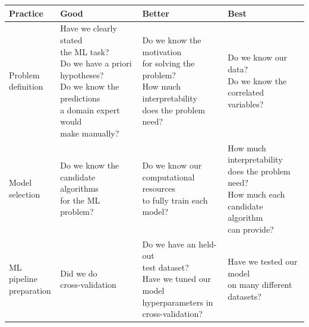 \documentclass[11pt,]{article}
\begin{document}
\small

\begin{tabular}{|l|l|l|l|}
\hline

\rowcolor{lightgray}
\textbf{Practice} & \textbf{Good} & \textbf{Better} & \textbf{Best} \\ \hline

\makecell[l]{Problem \\ definition} & \makecell[l]{Have we clearly stated \\ the ML task? \\ Do we have a priori hypotheses? \\Do we know the predictions \\ a domain expert would \\ make manually?} & \makecell[l]{Do we know the motivation \\ for solving the problem? \\ How much interpretability \\ does the problem need? } & \makecell[l]{Do we know our data? \\ Do we know the correlated \\ variables? } \\ \hline

\makecell[l]{Model \\ selection} & \makecell[l]{Do we know the \\ candidate algorithms \\ for the ML problem? \\} & \makecell[l]{Do we know our \\ computational resources \\ to fully train each model?} & \makecell[l]{How much interpretability \\ does the problem need? \\ How much each \\ candidate algorithm \\ can provide?} \\ \hline

\makecell[l]{ML pipeline \\ preparation} & \makecell[l]{Did we do \\ cross-validation} & \makecell[l]{Do we have an held-out \\ test dataset? \\ Have we tuned our model \\ hyperparameters in \\ cross-validation?} & \makecell[l]{Have we tested our model \\ on many different \\  datasets?} \\ \hline


\end{tabular}
\end{document}
